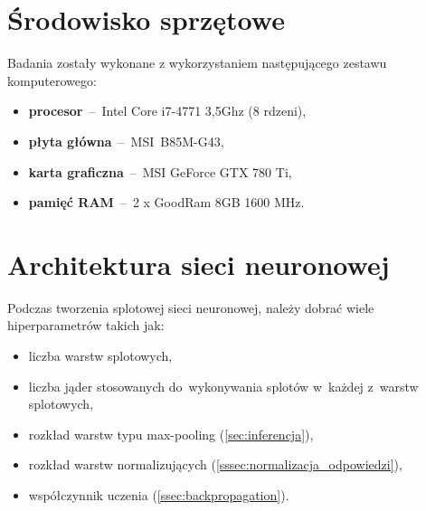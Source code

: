 \section{Środowisko sprzętowe}
Badania zostały wykonane z wykorzystaniem następującego zestawu komputerowego:
\begin{itemize}
    \item \textbf{procesor}~--~Intel Core i7-4771 3,5Ghz (8 rdzeni),
    \item \textbf{płyta główna}~--~MSI~B85M-G43,
    \item \textbf{karta graficzna}~--~MSI GeForce GTX 780 Ti,
    \item \textbf{pamięć RAM}~--~2 x GoodRam 8GB 1600 MHz.
\end{itemize}

\section{Architektura sieci neuronowej} \label{sec:arch-sieci-neuronowej}
Podczas tworzenia splotowej sieci neuronowej, należy dobrać wiele hiperparametrów takich jak:
\begin{itemize}
    \item liczba warstw splotowych,
    \item liczba jąder stosowanych do~wykonywania splotów w~każdej z~warstw splotowych,
    \item rozkład warstw typu max-pooling (\ref{sec:inferencja}),
    \item rozkład warstw normalizujących (\ref{sssec:normalizacja_odpowiedzi}),
    \item współczynnik uczenia (\ref{ssec:backpropagation}).
\end{itemize}

